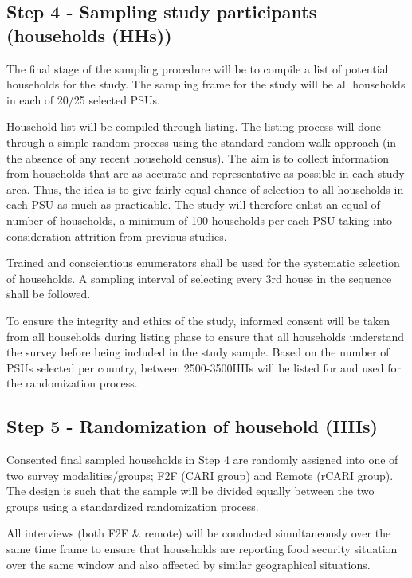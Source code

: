 \documentclass[11pt,harvard]{article}
\begin{document}
\subsection*{Step 4 - Sampling study participants (households (HHs))}
	The final stage of the sampling procedure will be to compile a list of potential households for the study. The sampling frame for the study will be all households in each of 20/25 selected PSUs.
	 
	Household list will be compiled through listing. The listing process will done through a simple random process using the standard random-walk approach (in the absence of any recent household census). The aim is to collect information from households that are as accurate and representative as possible in each study area. Thus, the idea is to give fairly equal chance of selection to all households in each PSU as much as practicable. The study will therefore enlist an equal of number of households, a minimum of 100 households per each PSU taking into consideration attrition from previous studies. 
	
	Trained and conscientious enumerators shall be used for the systematic selection of households. A sampling interval of selecting every 3rd house in the sequence shall be followed. 
	
	To ensure the integrity and ethics of the study, informed consent will be taken from all households during listing phase to ensure that all households understand the survey before being included in the study sample. Based on the number of PSUs selected per country, between 2500-3500HHs will be listed for and used for the randomization process.
	
\subsection*{Step 5 - Randomization of household (HHs)}
	Consented final sampled households in Step 4 are randomly assigned into one of two survey modalities/groups; F2F (CARI group) and Remote (rCARI group). The design is such that the sample will be divided equally between the two groups using a standardized randomization process. 
	
	All interviews (both F2F \& remote) will be conducted simultaneously over the same time frame to ensure that households are reporting food security situation over the same window and also affected by similar geographical situations.
	
\pagebreak
\end{document}
